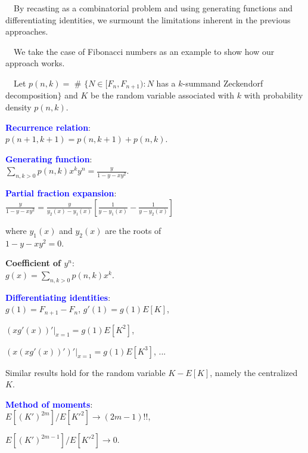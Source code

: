 \documentclass[landscape,final,columns=3]{baposter}
\begin{document}
\begin{poster}
{\begin{multicols}{2}
\ \ By recasting as a combinatorial problem and using generating functions and differentiating identities, we surmount the limitations inherent in the previous approaches.

\ \ We take the case of Fibonacci numbers as an example to show how our approach works.

\ \ Let $p(n,k)=$ \# $\{N\in [F_n, F_{n+1}):N$ has a $k$-summand
Zeckendorf decomposition$\}$ and $K$ be the random variable associated with $k$ with probability density $p(n,k)$.


\begin{list}{}{\leftmargin=1em}

\vspace{-0.1in}

\item {{\textcolor{blue}{\bf{Recurrence relation}}}}:\\
$p(n+1,k+1)=p(n,k+1)+p(n,k)$.

\vspace{-0.02in}

\item {{\textcolor{blue}{\bf{Generating function}}}}: \\
$\sum_{n,k>0}p(n,k)x^ky^n =\frac{y}{1-y-xy^2}$.

\vspace{-0.02in}

\item {{\textcolor{blue}{\bf{Partial fraction expansion}}}}: \\
$\frac{y}{1-y-xy^2} =\frac{y}{y_2(x)-y_1(x)}\left[\frac{1}{y-y_1(x)}-\frac{1}{y-y_2(x)}\right]$

where $y_1(x)$ and $y_2(x)$ are the roots of\\
$1-y-xy^2=0$.

{\bf{Coefficient of $y^n$}}: \\
$g(x)=\sum_{n,k>0}p(n,k)x^k$.

\vspace{-0.02in}

\item {{\textcolor{blue}{\bf{Differentiating identities}}}}: \\
$g(1)=F_{n+1}-F_n$,  $g'(1)=g(1)E[K]$,

$\left(xg'(x)\right)'|_{x=1}=g(1)E[K^2]$,

$\left(x\left(xg'(x)\right)'\right)'|_{x=1}=g(1)E[K^3]$, ...

Similar results hold for the random variable $K-E[K]$, namely the centralized $K$.

\vspace{-0.02in}

\item {{\textcolor{blue}{\bf{Method of moments}}}}: \\
$E[(K')^{2m}]/E[K'^2]\rightarrow (2m-1)!!$,

$E[(K')^{2m-1}]/E[K'^2]\rightarrow 0$.
\end{list}

\vspace{0.1em}

\end{multicols}

}

\end{poster}%
%
\end{document}
